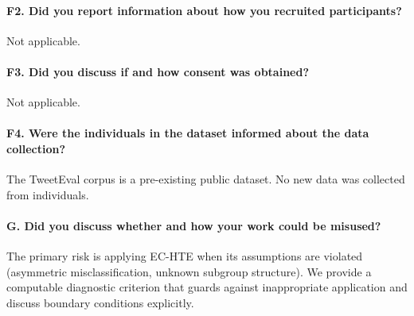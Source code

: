 \paragraph{F2. Did you report information about how you recruited participants?}
Not applicable.

\paragraph{F3. Did you discuss if and how consent was obtained?}
Not applicable.

\paragraph{F4. Were the individuals in the dataset informed about the data collection?}
The TweetEval corpus is a pre-existing public dataset. No new data was collected from individuals.

\paragraph{G. Did you discuss whether and how your work could be misused?}
The primary risk is applying EC-HTE when its assumptions are violated (asymmetric misclassification, unknown subgroup structure). We provide a computable diagnostic criterion that guards against inappropriate application and discuss boundary conditions explicitly.
